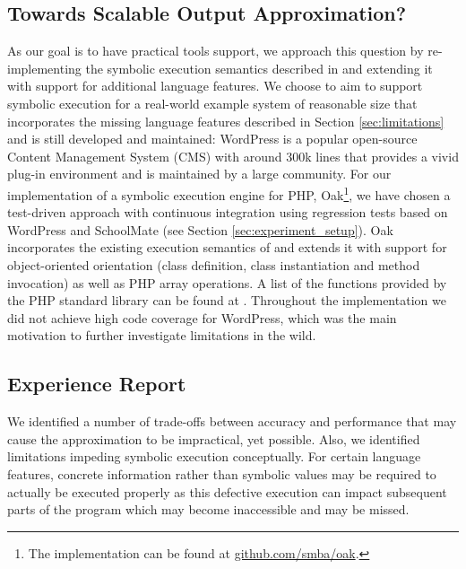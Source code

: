 \documentclass[sigconf]{acmart}
\begin{document}
\subsection{Towards Scalable Output Approximation?}
As our goal is to have practical tools support, we approach this question by
re-implementing the symbolic execution semantics described in
\cite{Nguyen:2014:BCG:2635868.2635928} and extending it with support for
additional language features. We choose to aim to support symbolic execution
for a real-world example system of reasonable size that incorporates the
missing language features described in Section \ref{sec:limitations} and is
still developed and maintained: \textsf{WordPress} is a popular open-source
Content Management System (CMS) with around 300k lines that provides a vivid
plug-in environment and is maintained by a large community.
For our implementation of a symbolic execution engine for PHP,
\textsf{Oak}\footnote{The implementation can be found
at \url{github.com/smba/oak}.}, we have chosen a test-driven approach with
continuous integration using regression tests based on \textsf{WordPress} and \textsf{SchoolMate} (see Section \ref{sec:experiment_setup}). Oak incorporates the existing execution semantics
of \cite{Nguyen:2014:BCG:2635868.2635928} and extends it with support for
object-oriented orientation (class definition, class instantiation and method
invocation) as well as PHP array operations. A list of the functions provided
by the PHP standard library can be found at \cite{PHP}.
Throughout the implementation we did not achieve high code coverage for
WordPress, which was the main motivation to further investigate limitations in
the wild.

\subsection{Experience Report}
We identified a number of trade-offs between accuracy and performance that may
cause the approximation to be impractical, yet possible. Also, we identified
limitations impeding symbolic execution conceptually. For certain language
features, concrete information rather than symbolic values may be required to
actually be executed properly as this defective execution can impact subsequent
parts of the program which may become inaccessible and may be missed.
\end{document}
